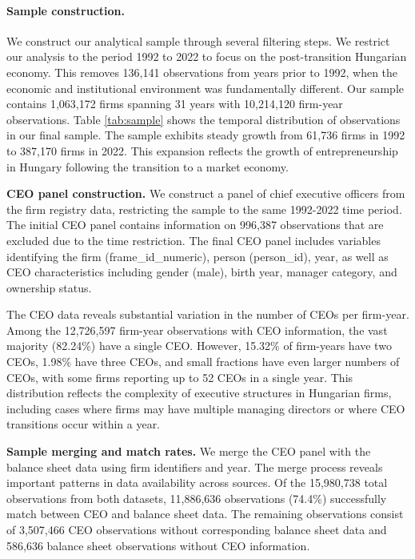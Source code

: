 \documentclass[11pt,a4paper]{article}
\begin{document}
\paragraph{Sample construction.} We construct our analytical sample through several filtering steps. We restrict our analysis to the period 1992 to 2022 to focus on the post-transition Hungarian economy. This removes 136,141 observations from years prior to 1992, when the economic and institutional environment was fundamentally different. Our sample contains 1,063,172 firms spanning 31 years with 10,214,120 firm-year observations. Table \ref{tab:sample} shows the temporal distribution of observations in our final sample. The sample exhibits steady growth from 61,736 firms in 1992 to 387,170 firms in 2022. This expansion reflects the growth of entrepreneurship in Hungary following the transition to a market economy.



\textbf{CEO panel construction.} We construct a panel of chief executive officers from the firm registry data, restricting the sample to the same 1992-2022 time period. The initial CEO panel contains information on 996,387 observations that are excluded due to the time restriction. The final CEO panel includes variables identifying the firm (frame\_id\_numeric), person (person\_id), year, as well as CEO characteristics including gender (male), birth year, manager category, and ownership status.

The CEO data reveals substantial variation in the number of CEOs per firm-year. Among the 12,726,597 firm-year observations with CEO information, the vast majority (82.24\%) have a single CEO. However, 15.32\% of firm-years have two CEOs, 1.98\% have three CEOs, and small fractions have even larger numbers of CEOs, with some firms reporting up to 52 CEOs in a single year. This distribution reflects the complexity of executive structures in Hungarian firms, including cases where firms may have multiple managing directors or where CEO transitions occur within a year.

\textbf{Sample merging and match rates.} We merge the CEO panel with the balance sheet data using firm identifiers and year. The merge process reveals important patterns in data availability across sources. Of the 15,980,738 total observations from both datasets, 11,886,636 observations (74.4\%) successfully match between CEO and balance sheet data. The remaining observations consist of 3,507,466 CEO observations without corresponding balance sheet data and 586,636 balance sheet observations without CEO information.
\end{document}
